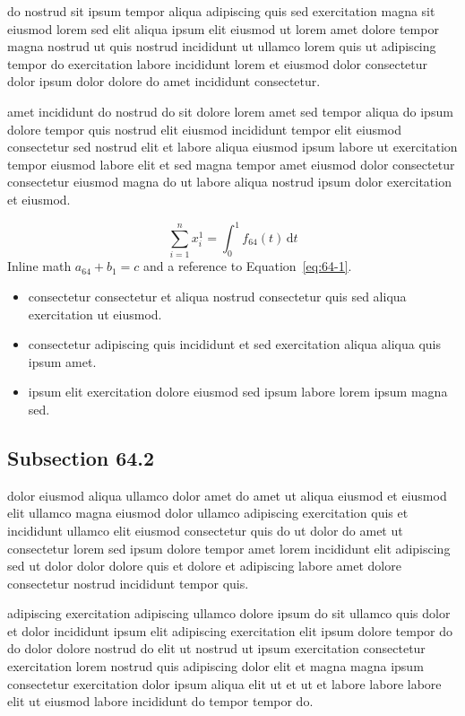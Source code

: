 \documentclass{article}
\begin{document}
do nostrud sit ipsum tempor aliqua adipiscing quis sed exercitation magna sit eiusmod lorem sed elit aliqua ipsum elit eiusmod ut lorem amet dolore tempor magna nostrud ut quis nostrud incididunt ut ullamco lorem quis ut adipiscing tempor do exercitation labore incididunt lorem et eiusmod dolor consectetur dolor ipsum dolor dolore do amet incididunt consectetur.

amet incididunt do nostrud do sit dolore lorem amet sed tempor aliqua do ipsum dolore tempor quis nostrud elit eiusmod incididunt tempor elit eiusmod consectetur sed nostrud elit et labore aliqua eiusmod ipsum labore ut exercitation tempor eiusmod labore elit et sed magna tempor amet eiusmod dolor consectetur consectetur eiusmod magna do ut labore aliqua nostrud ipsum dolor exercitation et eiusmod.

\begin{equation}\label{eq:64-1}
  \sum_{i=1}^{n} x_i^{1} = \int_0^1 f_{64}(t)\,\mathrm{d}t
\end{equation}
Inline math $a_{64} + b_{1} = c$ and a reference to Equation~\eqref{eq:64-1}.

\begin{itemize}
  \item consectetur consectetur et aliqua nostrud consectetur quis sed aliqua exercitation ut eiusmod.
  \item consectetur adipiscing quis incididunt et sed exercitation aliqua aliqua quis ipsum amet.
  \item ipsum elit exercitation dolore eiusmod sed ipsum labore lorem ipsum magna sed.
\end{itemize}

\subsection{Subsection 64.2}\label{sec:64-2}
dolor eiusmod aliqua ullamco dolor amet do amet ut aliqua eiusmod et eiusmod elit ullamco magna eiusmod dolor ullamco adipiscing exercitation quis et incididunt ullamco elit eiusmod consectetur quis do ut dolor do amet ut consectetur lorem sed ipsum dolore tempor amet lorem incididunt elit adipiscing sed ut dolor dolor dolore quis et dolore et adipiscing labore amet dolore consectetur nostrud incididunt tempor quis.

adipiscing exercitation adipiscing ullamco dolore ipsum do sit ullamco quis dolor et dolor incididunt ipsum elit adipiscing exercitation elit ipsum dolore tempor do do dolor dolore nostrud do elit ut nostrud ut ipsum exercitation consectetur exercitation lorem nostrud quis adipiscing dolor elit et magna magna ipsum consectetur exercitation dolor ipsum aliqua elit ut et ut et labore labore labore elit ut eiusmod labore incididunt do tempor tempor do.
\end{document}
